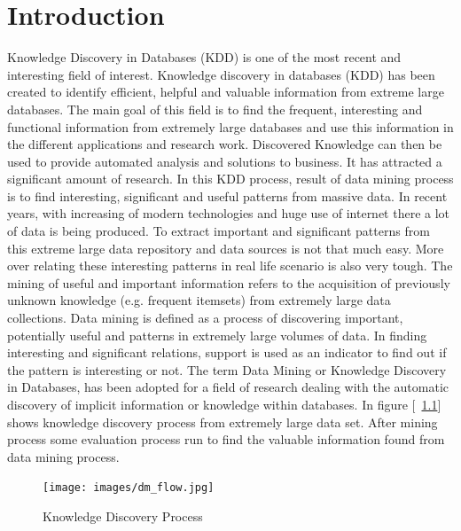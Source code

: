 %
\chapter{Introduction}
Knowledge Discovery in Databases (KDD) is one of the most recent and interesting field of interest. Knowledge discovery in databases (KDD) has been created to identify efficient, helpful and valuable information from extreme large databases. The main goal of this field is to find the frequent, interesting and functional information from extremely large databases and use this information in the different applications and research work. Discovered Knowledge can then be used to provide automated analysis and solutions to business. It has attracted a significant amount of research. In this KDD process, result of data mining process is to find interesting, significant and useful patterns from massive data. In recent years, with increasing of modern technologies and huge use of internet there a lot of data is being produced. To extract important and significant patterns from this extreme large data repository and data sources is not that much easy. More over relating these interesting patterns in real life scenario is also very tough. The mining of useful and important information refers to the acquisition of previously unknown knowledge (e.g. frequent itemsets) from extremely large data collections. Data mining is defined as a process of discovering important, potentially useful and patterns in extremely large volumes of data. In finding interesting and significant relations, support is used as an indicator to find out if the pattern is interesting or not. The term Data Mining or Knowledge Discovery in Databases, has been adopted for a field of research dealing with the automatic discovery of implicit information or knowledge within databases. In figure [~\ref{figure:dm_flow}] shows knowledge discovery process from extremely large data set. After mining process some evaluation process run to find the valuable information found from data mining process.\\
\begin{figure}
\centering
  \texttt{[image: images/dm\_flow.jpg]}
\caption{Knowledge Discovery Process}
\label{figure:dm_flow}
\end{figure}
